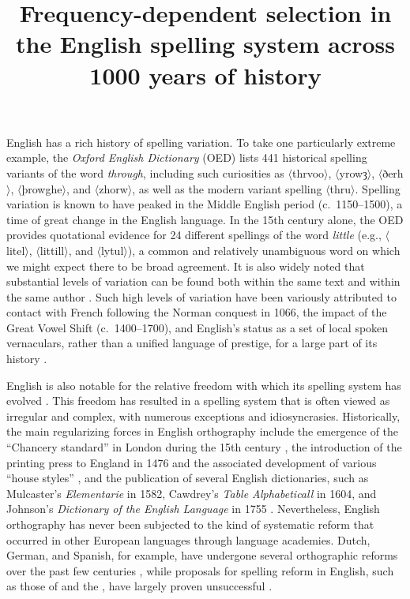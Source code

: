 \documentclass[doc,biblatex]{apa7}
\title{Frequency-dependent selection in the English spelling system across 1000 years of history}
\newcommand\spelling[1]{\allowbreak$\langle$#1$\rangle$}
\begin{document}
\maketitle

\noindent
English has a rich history of spelling variation. To take one particularly extreme example, the \textit{Oxford English Dictionary} (OED) lists 441 historical spelling variants of the word \textit{through}, including such curiosities as \spelling{thrvoo}, \spelling{yrowȝ}, \spelling{ðerh}, \spelling{þrowghe}, and \spelling{zhorw}, as well as the modern variant spelling \spelling{thru}. Spelling variation is known to have peaked in the Middle English period (c.~1150--1500), a time of great change in the English language. In the 15th century alone, the OED provides quotational evidence for 24 different spellings of the word \textit{little} (e.g., \spelling{litel}, \spelling{littill}, and \spelling{lytul}), a common and relatively unambiguous word on which we might expect there to be broad agreement. It is also widely noted that substantial levels of variation can be found both within the same text \parencite[e.g.,][]{Wojcik:2021} and within the same author \parencite[e.g.,][]{Evans:2012}. Such high levels of variation have been variously attributed to contact with French following the Norman conquest in 1066, the impact of the Great Vowel Shift (c.~1400--1700), and English's status as a set of local spoken vernaculars, rather than a unified language of prestige, for a large part of its history \parencite{Crystal:2005, Fisher:1996, Scragg:1974, Smith:1996, Vallins:1954}.

English is also notable for the relative freedom with which its spelling system has evolved \parencite{Stenroos:2016}. This freedom \parencite[or ``anarchy'' as described by][]{Berg:2017} has resulted in a spelling system that is often viewed as irregular and complex, with numerous exceptions and idiosyncrasies. Historically, the main regularizing forces in English orthography include the emergence of the ``Chancery standard'' in London during the 15th century \parencite{Fisher:1996, Wright:2020}, the introduction of the printing press to England in 1476 and the associated development of various ``house styles'' \parencite{Condorelli:2022}, and the publication of several English dictionaries, such as Mulcaster's \textit{Elementarie} in 1582, Cawdrey's \textit{Table Alphabeticall} in 1604, and Johnson's \textit{Dictionary of the English Language} in 1755 \parencite{Considine:2012}. Nevertheless, English orthography has never been subjected to the kind of systematic reform that occurred in other European languages through language academies. Dutch, German, and Spanish, for example, have undergone several orthographic reforms over the past few centuries \parencite{Baddeley:2012, Neijt:2023, Stickel:2012, Villa:2015}, while proposals for spelling reform in English, such as those of \textcite{Hart:1569} and the \textcite{SSB:2012}, have largely proven unsuccessful \parencite{Zachrisson:1931}.
\end{document}
